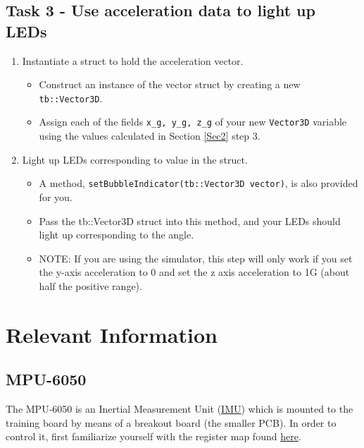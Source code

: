 \documentclass{article}
\begin{document}
    \subsection{Task 3 - Use acceleration data to light up LEDs}
        \begin{enumerate}
            \item Instantiate a struct to hold the acceleration vector.
            \begin{itemize}
                \item Construct an instance of the vector struct by creating a new \texttt{tb::Vector3D}. 
                \item Assign each of the fields \texttt{x\_g, y\_g, z\_g}  of your new \texttt{Vector3D} variable using the values calculated in Section \ref{Sec2} step 3. 
            \end{itemize}
            \item Light up LEDs corresponding to value in the struct.
            \begin{itemize}
                \item A method, \texttt{setBubbleIndicator(tb::Vector3D vector)}, is also provided for you.
                \item Pass the tb::Vector3D struct into this method, and your LEDs should light up corresponding to the angle. 
                \item NOTE: If you are using the simulator, this step will only work if you set the y-axis acceleration to 0 and set the z axis acceleration to 1G (about half the positive range).
            \end{itemize}
        \end{enumerate}
    

\section{Relevant Information}
    \subsection{MPU-6050} \label{readwrite}
        The MPU-6050 is an Inertial Measurement Unit (\href{https://en.wikipedia.org/wiki/Inertial_measurement_unit}{IMU}) which is mounted to the training board by means of a breakout board (the smaller PCB).  
        In order to control it, first familiarize yourself with the register map found \href{https://cdn.sparkfun.com/datasheets/Sensors/Accelerometers/RM-MPU-6000A.pdf}{here}.
        
\end{document}
